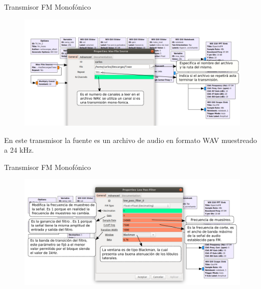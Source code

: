 \begin{frame}{Transmisor FM Monofónico}

\begin{figure}[H]
\centering
\vspace{-3mm}
\includegraphics[width=\textwidth]{parte3/lab11/pdf/lab11_2.pdf}
\end{figure}

En este transmisor la fuente es un archivo de audio en formato WAV muestreado a 24 kHz.


\end{frame}

\begin{frame}{Transmisor FM Monofónico}

\begin{figure}[H]
\centering
\vspace{-3mm}
\includegraphics[width=\textwidth]{parte3/lab11/pdf/lab11_3.pdf}
\end{figure}

\end{frame}

